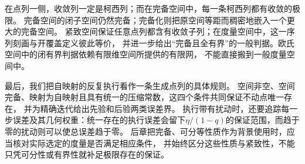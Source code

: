 在点列一侧，收敛列一定是柯西列；而在完备空间中，每一条柯西列都有收敛的极限。
完备空间的闭子空间仍然完备；完备化则把原空间等距而稠密地嵌入一个更大的完备空间。
紧致空间保证任意点列都含有收敛子列；在度量空间中，这一序列刻画与开覆盖定义彼此等价，
并进一步给出“完备且全有界”的一般判据。欧氏空间中的闭有界判据依赖有限维空间所提供的有限网，
不能直接搬到一般度量空间中。

最后，我们把自映射的反复执行看作一条生成点列的具体规则。
空间非空、空间完备、映射为自映射且具有统一的压缩常数，这四个条件共同保证不动点唯一存在，
并为精确迭代给出先验和后验两类误差界。
执行带有扰动时，还要追踪每一步误差及其几何权重：统一存在的执行误差会留下$\eta/(1-q)$的保证范围，而趋于零的扰动则可以使总误差趋于零。
后章把完备、可分等性质作为背景使用时，应当核对实际选定的度量是否满足相应条件，
并始终区分这些性质与紧致性，不能只凭可分性或有界性就补足极限存在的保证。

\FloatBarrier
